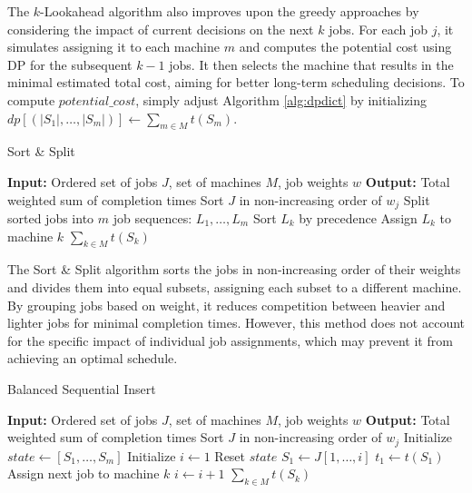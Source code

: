The $k$-Lookahead algorithm also improves upon the greedy approaches by considering the impact of current decisions on the next $k$ jobs. For each job $j$, it simulates assigning it to each machine $m$ and computes the potential cost using DP for the subsequent $k-1$ jobs. It then selects the machine that results in the minimal estimated total cost, aiming for better long-term scheduling decisions. To compute \texttt{$potential\_cost$}, simply adjust Algorithm \eqref{alg:dpdict} by initializing $dp[( \left| S_1 \right|, \dots, \left| S_m \right|)] \gets \sum_{m \in M} t(S_m)$.

\begin{algorithm}[H]
    \caption{Sort \& Split}\label{alg:sortsplit}
    \begin{algorithmic}[1]
        \State \textbf{Input:} Ordered set of jobs $J$, set of machines $M$, job weights $w$
        \State \textbf{Output:} Total weighted sum of completion times
        \State Sort $J$ in non-increasing order of $w_j$
        \State Split sorted jobs into $m$ job sequences: $L_1, \dots, L_m$
            \State Sort $L_k$ by precedence
            \State Assign $L_k$ to machine $k$
        \EndFor
        \State \Return $\sum_{k \in M} t(S_k)$
    \end{algorithmic}
\end{algorithm}

The Sort \& Split algorithm sorts the jobs in non-increasing order of their weights and divides them into equal subsets, assigning each subset to a different machine. By grouping jobs based on weight, it reduces competition between heavier and lighter jobs for minimal completion times. However, this method does not account for the specific impact of individual job assignments, which may prevent it from achieving an optimal schedule.

\begin{algorithm}[H]
    \caption{Balanced Sequential Insert}\label{alg:bsi}
    \begin{algorithmic}[1]
        \State \textbf{Input:} Ordered set of jobs $J$, set of machines $M$, job weights $w$
        \State \textbf{Output:} Total weighted sum of completion times
        \State Sort $J$ in non-increasing order of $w_j$
        \State Initialize $state \gets [S_1, \dots, S_m]$
        \State Initialize $i \gets 1$
            \State Reset $state$
            \State $S_1 \gets J[1, \dots, i]$
            \State $t_1 \gets t(S_1)$
                    \State Assign next job to machine $k$
                \EndWhile
            \EndFor
            \State $i \gets i + 1$
        \EndWhile
        \State \Return $\sum_{k \in M} t(S_k)$
    \end{algorithmic}
\end{algorithm}

